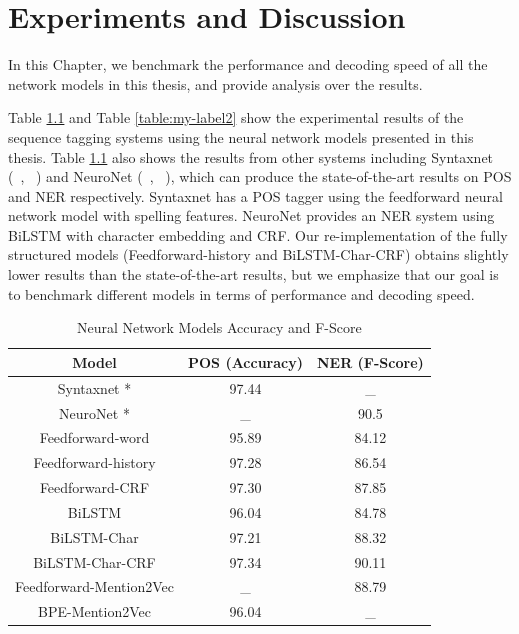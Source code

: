 \documentclass{sfuthesis}
\begin{document}
\chapter{Experiments and Discussion}

In this Chapter, we benchmark the performance and decoding speed of all the network models in this thesis, and provide analysis over the results.

Table \ref{table:my-label1} and Table \ref{table:my-label2} show the experimental results of the sequence tagging systems using the neural network models presented in this thesis. Table \ref{table:my-label1} also shows the results from other systems including Syntaxnet (~\citeauthor{alberti2017syntaxnet}, ~\citeyear{alberti2017syntaxnet}) and NeuroNet (~\citeauthor{2017neuroner}, ~\citeyear{2017neuroner}), which can produce the state-of-the-art results on POS and NER respectively. Syntaxnet has a POS tagger using the feedforward neural network model with spelling features. NeuroNet provides an NER system using BiLSTM with character embedding and CRF. Our re-implementation of the fully structured models (Feedforward-history and BiLSTM-Char-CRF) obtains slightly lower results than the state-of-the-art results, but we emphasize that our goal is to benchmark different models in terms of performance and decoding speed.

\begin{table}[]
\centering
\caption{Neural Network Models Accuracy and F-Score}
\label{table:my-label1}
\begin{tabular}{|c|c|c|}
\hline
Model         & POS (Accuracy)  & NER (F-Score)       \\ \hline
Syntaxnet \**    & 97.44         &   _     \\ \hline
NeuroNet \**    & _    & 90.5                \\ \hline 
Feedforward-word    & 95.89          &   84.12     \\ \hline
Feedforward-history & 97.28     & 86.54        \\ \hline
Feedforward-CRF     & 97.30          &   87.85     \\ \hline
BiLSTM  & 96.04     & 84.78                             \\ \hline
BiLSTM-Char & 97.21 & 88.32             \\ \hline
BiLSTM-Char-CRF & 97.34  & 90.11             \\ \hline
Feedforward-Mention2Vec  & _    & 88.79                       \\ \hline
BPE-Mention2Vec & 96.04     &  _   \\ \hline   
\end{tabular}
\end{table}
\end{document}
